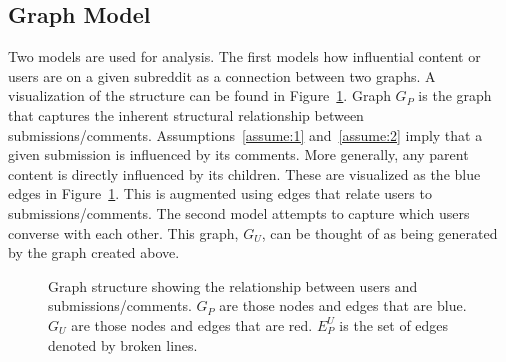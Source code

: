 \documentclass[letterpaper, 10 pt, conference]{ieeeconf}
\theoremstyle{definition}
\begin{document}
\subsection{Graph Model}
Two models are used for analysis. The first models how influential content or users are on a given subreddit as a connection between two graphs. A visualization of the structure can be found in Figure~\ref{fig:model:hypergraph}. Graph \(G_P\) is the graph that captures the inherent structural relationship between submissions/comments. Assumptions~\ref{assume:1} and~\ref{assume:2} imply that a given submission is influenced by its comments. More generally, any parent content is directly influenced by its children. These are visualized as the blue edges in Figure~\ref{fig:model:hypergraph}. This is augmented using edges that relate users to submissions/comments. The second model attempts to capture which users converse with each other. This graph, \(G_U\), can be thought of as being generated by the graph created above.

\begin{figure}
  \centering
  \caption{Graph structure showing the relationship between users and submissions/comments. \(G_P\) are those nodes and edges that are blue. \(G_U\) are those nodes and edges that are red. \(E_P^U\) is the set of edges denoted by broken lines.}
  \label{fig:model:hypergraph}
\end{figure}
\end{document}
